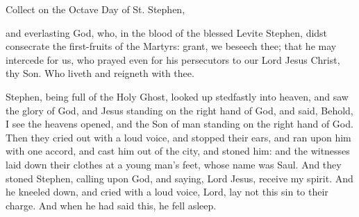 \begin{rubric}
    Collect on the Octave Day of St. Stephen,
\end{rubric}
 and everlasting God, who, in the blood of the blessed Levite Stephen, didst consecrate the first-fruits of the Martyrs: grant, we beseech thee; that he may intercede for us, who prayed even for his persecutors to our Lord Jesus Christ, thy Son. Who liveth and reigneth with thee.

 Stephen, being full of the Holy Ghost, looked up stedfastly into heaven, and saw the glory of God, and Jesus standing on the right hand of God, and said, Behold, I see the heavens opened, and the Son of man standing on the right hand of God. Then they cried out with a loud voice, and stopped their ears, and ran upon him with one accord, and cast him out of the city, and stoned him: and the witnesses laid down their clothes at a young man’s feet, whose name was Saul. And they stoned Stephen, calling upon God, and saying, Lord Jesus, receive my spirit. And he kneeled down, and cried with a loud voice, Lord, lay not this sin to their charge. And when he had said this, he fell asleep.


